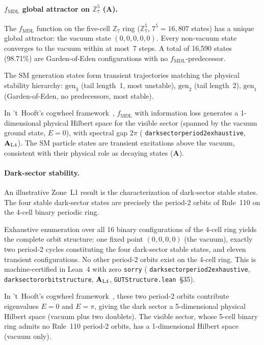 \documentclass[12pt,letterpaper]{article}
\newcommand{\fmdl}{f_{\mathrm{MDL}}}
\newcommand{\Zseven}{\mathbb{Z}_7}
\newcommand{\catAL}{\ensuremath{\textbf{A}_{\rm L4}}}
\newcommand{\catA}{\textbf{A}}
\newcommand{\lean}[1]{%
  \penalty-100
  \begingroup\def\_{\textunderscore\allowbreak}\texttt{#1}\endgroup}
\begin{document}
\paragraph{$\fmdl$ global attractor on $\Zseven^5$ (\catA).}
The $\fmdl$ function on the five-cell $\Zseven$ ring ($\Zseven^5$, $7^5 = 16{,}807$ states)
has a unique global attractor: the vacuum state $(0,0,0,0,0)$.  Every non-vacuum state
converges to the vacuum within at most~7 steps.  A total of 16,590 states (98.71\%) are
Garden-of-Eden configurations with no $\fmdl$-predecessor.

The SM generation states form transient trajectories matching the physical stability
hierarchy: $\mathrm{gen}_3$ (tail length~1, most unstable), $\mathrm{gen}_2$ (tail
length~2), $\mathrm{gen}_1$ (Garden-of-Eden, no predecessors, most stable).

In 't~Hooft's cogwheel framework~\cite{tHooft2016CA}, $\fmdl$ with information loss
generates a 1-dimensional physical Hilbert space for the visible sector (spanned by the
vacuum ground state, $E = 0$), with spectral gap $2\pi$
(\lean{dark\_sector\_period2\_exhaustive}, $\catAL$).  The SM particle states are
transient excitations above the vacuum, consistent with their physical role as decaying
states (\catA).

\paragraph{Dark-sector stability.}
An illustrative Zone~L1 result is the characterization of dark-sector stable
states.  The four stable dark-sector states are precisely the period-2 orbits of
Rule~110 on the 4-cell binary periodic ring.

Exhaustive enumeration over all 16 binary configurations of the 4-cell ring yields
the complete orbit structure: one fixed point $(0,0,0,0)$ (the vacuum), exactly two
period-2 cycles constituting the four dark-sector stable states, and eleven transient
configurations.  No other period-2 orbits exist on the 4-cell ring.  This is
machine-certified in Lean~4 with zero \texttt{sorry}
(\lean{dark\_sector\_period2\_exhaustive},
\lean{dark\_sector\_orbit\_structure}, \catAL,
\lean{GUTStructure.lean}~\S35).

In 't~Hooft's cogwheel framework~\cite{tHooft2016CA}, these two period-2 orbits
contribute eigenvalues $E = 0$ and $E = \pi$, giving the dark sector a
5-dimensional physical Hilbert space (vacuum plus two doublets).  The visible sector,
whose 5-cell binary ring admits no Rule~110 period-2 orbits, has a
1-dimensional Hilbert space (vacuum only).
\end{document}
